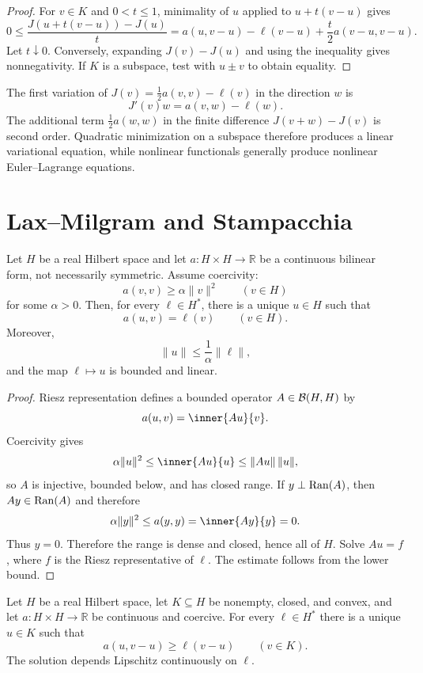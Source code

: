 \begin{proof}
For $v\in K$ and $0<t\le1$, minimality of $u$ applied to
$u+t(v-u)$ gives
\[
  0\le\frac{J(u+t(v-u))-J(u)}{t}
  =a(u,v-u)-\ell(v-u)+\frac t2a(v-u,v-u).
\]
Let $t\downarrow0$.  Conversely, expanding $J(v)-J(u)$ and using the
inequality gives nonnegativity.  If $K$ is a subspace, test with
$u\pm v$ to obtain equality.
\end{proof}

\begin{noteremark}
The first variation of
$J(v)=\frac12a(v,v)-\ell(v)$ in the direction $w$ is
\[
  J'(v)w=a(v,w)-\ell(w).
\]
The additional term $\frac12a(w,w)$ in the finite difference
$J(v+w)-J(v)$ is second order.  Quadratic minimization on a subspace therefore
produces a linear variational equation, while nonlinear functionals generally
produce nonlinear Euler--Lagrange equations.
\end{noteremark}

\section{Lax--Milgram and Stampacchia}

\begin{notetheorem}
Let $H$ be a real Hilbert space and let
$a\colon H\times H\to\mathbb R$ be a continuous bilinear form, not
necessarily symmetric.
Assume coercivity:
\[
  a(v,v)\ge\alpha\|v\|^2
  \qquad(v\in H)
\]
for some $\alpha>0$.  Then, for every $\ell\in H^*$, there is a unique
$u\in H$ such that
\[
  a(u,v)=\ell(v)
  \qquad(v\in H).
\]
Moreover,
\[
  \|u\|\le\frac1\alpha\|\ell\|,
\]
and the map $\ell\mapsto u$ is bounded and linear.
\end{notetheorem}

\begin{proof}
Riesz representation defines a bounded operator $A\in\mathcal{B}(H,H)$ by
\[
  a(u,v)=\inner{Au}{v}.
\]
Coercivity gives
\[
  \alpha\|u\|^2
  \le\inner{Au}{u}
  \le\|Au\|\,\|u\|,
\]
so $A$ is injective, bounded below, and has closed range.  If
$y\perp\operatorname{Ran}(A)$, then $Ay\in\operatorname{Ran}(A)$ and therefore
\[
  \alpha\|y\|^2
  \le a(y,y)
  =\inner{Ay}{y}
  =0.
\]
Thus $y=0$.  Therefore the range is dense and closed, hence all of $H$.  Solve
$Au=f$, where $f$ is the Riesz representative of $\ell$.  The estimate follows
from the lower bound.
\end{proof}

\begin{notetheorem}
Let $H$ be a real Hilbert space, let $K\subseteq H$ be nonempty, closed, and
convex, and let $a\colon H\times H\to\mathbb R$ be continuous and coercive.
For every
$\ell\in H^*$ there is a unique $u\in K$ such that
\[
  a(u,v-u)\ge\ell(v-u)
  \qquad(v\in K).
\]
The solution depends Lipschitz continuously on $\ell$.
\end{notetheorem}

